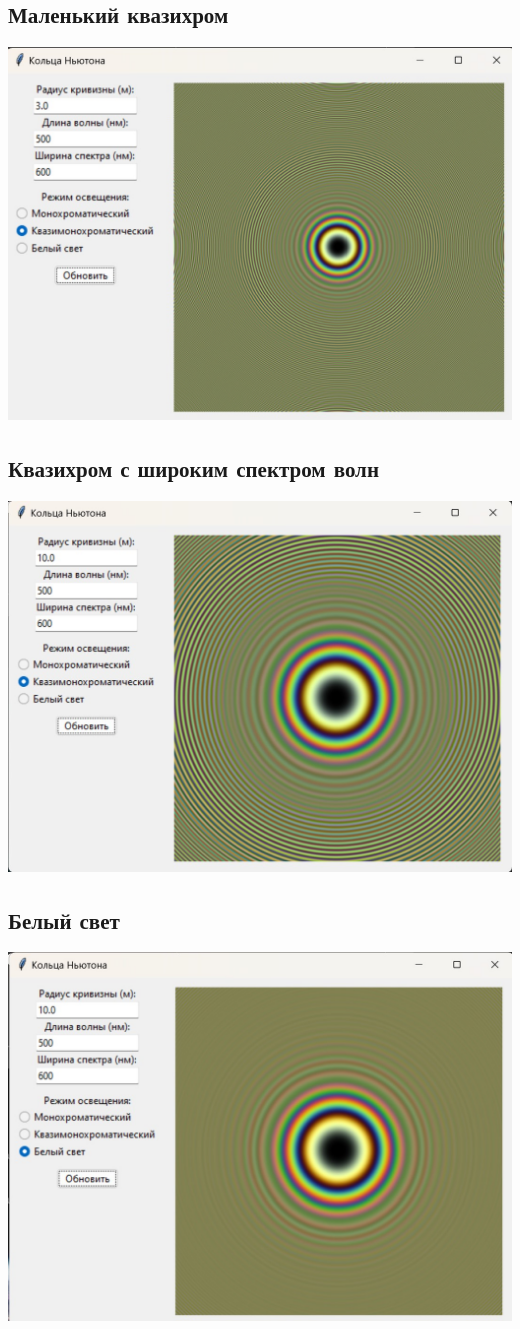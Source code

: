 \documentclass[a4paper,11pt]{article}
\theoremstyle{definition}
\begin{document}
    \subsection{Маленький квазихром}
    \includegraphics[scale=0.7]{3. Newton's rings/demo results/small_quasi}

    \subsection{Квазихром с широким спектром волн}
    \includegraphics[scale=0.7]{3. Newton's rings/demo results/wideSpectre_quasi}

    \subsection{Белый свет}
    \includegraphics[scale=0.7]{3. Newton's rings/demo results/whiteLight}
\end{document}
